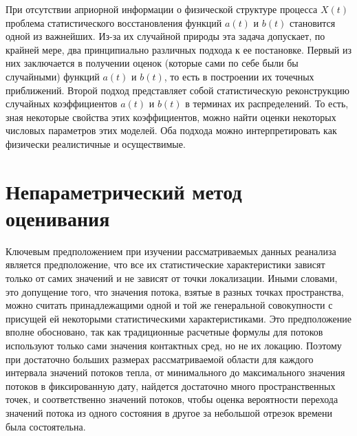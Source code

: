 При отсутствии априорной информации о физической структуре процесса $X(t)$ проблема статистического восстановления функций $a(t)$ и $b(t)$ становится одной из важнейших. Из-за их случайной природы эта задача допускает, по крайней мере, два принципиально различных подхода к ее постановке. Первый из них заключается в получении оценок (которые сами по себе были бы случайными) функций $a(t)$ и $b(t)$, то есть в построении их точечных приближений. Второй подход представляет собой статистическую реконструкцию случайных коэффициентов $a(t)$ и $b(t)$ в терминах их распределений. То есть, зная некоторые свойства этих коэффициентов, можно найти оценки некоторых числовых параметров этих моделей. Оба подхода можно интерпретировать как физически реалистичные и осуществимые.

\section{Непараметрический метод оценивания}
\label{SecNonparametic}
Ключевым предположением при изучении рассматриваемых данных реанализа является предположение, что все их статистические характеристики зависят только от самих значений и не зависят от точки локализации. Иными словами, это допущение того, что значения потока, взятые в разных точках пространства, можно считать принадлежащими одной и той же генеральной совокупности с присущей ей некоторыми статистическими характеристиками. Это предположение вполне обосновано, так как традиционные расчетные формулы для потоков~\cite{cronin2019air,leyba2019trends} используют только сами значения контактных сред, но не их локацию. Поэтому при достаточно больших размерах рассматриваемой области для каждого интервала значений потоков тепла, от минимального до максимального значения потоков в фиксированную дату, найдется достаточно много пространственных точек, и соответственно значений потоков, чтобы оценка вероятности перехода значений потока из одного состояния в другое за небольшой отрезок времени была состоятельна.


